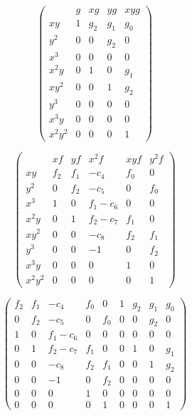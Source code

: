 \[ \left( \begin{array}{r|rrrrr}
         & g &  xg &  yg & xyg \\
  \hline
  x  y   & 1 & g_2 & g_1 & g_0 \\
     y^2 & 0 &   0 & g_2 &   0 \\
  x^3    & 0 &   0 &   0 &   0 \\
  x^2y   & 0 &   1 &   0 & g_1 \\
  x  y^2 & 0 &   0 &   1 & g_2 \\
     y^3 & 0 &   0 &   0 &   0 \\
  x^3y   & 0 &   0 &   0 &   0 \\
  x^2y^2 & 0 &   0 &   0 &   1
\end{array} \right) \]

\[ \left( \begin{array}{r|rrrrr}
         &  xf  & yf &      x^2f & xyf & y^2f \\
  \hline
  x  y   & f_2 & f_1 &     - c_4 & f_0 &   0 \\
     y^2 &   0 & f_2 &     - c_5 &   0 & f_0 \\
  x^3    &   1 &   0 & f_1 - c_6 &   0 &   0 \\
  x^2y   &   0 &   1 & f_2 - c_7 & f_1 &   0 \\
  x  y^2 &   0 &   0 &     - c_8 & f_2 & f_1 \\
     y^3 &   0 &   0 &       - 1 &   0 & f_2 \\
  x^3y   &   0 &   0 &         0 &   1 &   0 \\
  x^2y^2 &   0 &   0 &         0 &   0 &   1
\end{array} \right) \]

\[ \left( \begin{array}{rrrrr|rrrr}
  f_2 & f_1 &     - c_4 & f_0 &   0 & 1 & g_2 & g_1 & g_0 \\
    0 & f_2 &     - c_5 &   0 & f_0 & 0 &   0 & g_2 &   0 \\
    1 &   0 & f_1 - c_6 &   0 &   0 & 0 &   0 &   0 &   0 \\
    0 &   1 & f_2 - c_7 & f_1 &   0 & 0 &   1 &   0 & g_1 \\
    0 &   0 &     - c_8 & f_2 & f_1 & 0 &   0 &   1 & g_2 \\
    0 &   0 &       - 1 &   0 & f_2 & 0 &   0 &   0 &   0 \\
    0 &   0 &         0 &   1 &   0 & 0 &   0 &   0 &   0 \\
    0 &   0 &         0 &   0 &   1 & 0 &   0 &   0 &   1
\end{array} \right) \]

